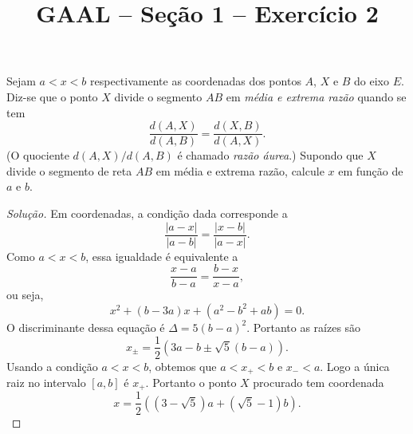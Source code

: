 \documentclass[a4paper,11pt]{article}
\title{GAAL -- Seção 1 -- Exercício 2}
\author{\empty}
\date{\empty}
\newcommand\onlyinsubfileone\maketitle
\begin{document}
\onlyinsubfileone

\begin{exercicio-gaal}[E2.S1]
  Sejam $a < x < b$ respectivamente as coordenadas dos pontos $A$, $X$ e $B$ do eixo $E$.
  Diz-se que o ponto $X$ divide o segmento $AB$ em \emph{média e extrema razão} quando se tem
  \[
    \frac{d(A,X)}{d(A,B)} = \frac{d(X,B)}{d(A,X)}.
  \]
  (O quociente $d(A,X)/d(A,B)$ é chamado \emph{razão áurea}.)
  Supondo que $X$ divide o segmento de reta $AB$ em média e extrema razão, calcule $x$ em função de $a$ e $b$.
\end{exercicio-gaal}

\begin{proof}[Solução]
  Em coordenadas, a condição dada corresponde a
  \[
    \frac{|a-x|}{|a-b|} = \frac{|x-b|}{|a-x|}.
  \]
  Como $a < x < b$, essa igualdade é equivalente a
  \[
    \frac{x-a}{b-a} = \frac{b-x}{x-a},
  \]
  ou seja,
  \[
    x^2 + (b-3a) x + (a^2-b^2+ab) = 0.
  \]
  O discriminante dessa equação é $\Delta = 5(b-a)^2$.
  Portanto as raízes são
  \[
    x_{\pm} = \frac{1}{2} (3a - b \pm \sqrt{5}(b-a)).
  \]
  Usando a condição $a < x < b$, obtemos que $a < x_+ < b$ e $x_- < a$.
  Logo a única raiz no intervalo $[a,b]$ é $x_+$.
  Portanto o ponto $X$ procurado tem coordenada
  \[
    x = \frac{1}{2} ( (3-\sqrt{5}) a + (\sqrt{5}-1) b ).
  \]
\end{proof}
\end{document}
